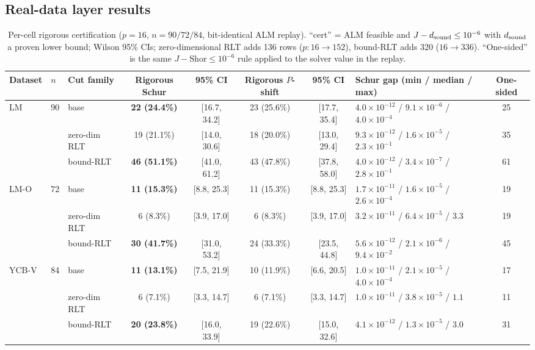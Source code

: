 \subsection{Real-data layer results}\label{app:real}
\begin{table}[t]
\centering
\caption{Per-cell rigorous certification ($p=16$, $n=90/72/84$, bit-identical ALM replay). ``cert'' = ALM feasible and $J-d_{\rm sound}\le10^{-6}$ with $d_{\rm sound}$ a proven lower bound; Wilson 95\% CIs; zero-dimensional RLT adds 136 rows ($p:16\to152$), bound-RLT adds 320 ($16\to336$). ``One-sided'' is the same $J-\mathrm{Shor}\le10^{-6}$ rule applied to the solver value in the replay.}
\label{tab:rigorous_full}
\scriptsize
\setlength{\tabcolsep}{2.5pt}
\begin{tabular}{@{}llp{1.9cm}ccccp{5.0cm}c@{}}
\toprule
Dataset & $n$ & Cut family & Rigorous Schur & 95\% CI & Rigorous $P$-shift & 95\% CI & Schur gap (min / median / max) & One-sided \\
\midrule
\multirow{3}{*}{LM} & \multirow{3}{*}{90} & base & \textbf{22 (24.4\%)} & [16.7, 34.2] & 23 (25.6\%) & [17.7, 35.4] & $4.0{\times}10^{-12}$ / $9.1{\times}10^{-6}$ / $4.0{\times}10^{-4}$ & 25 \\
 & & zero-dim RLT & 19 (21.1\%) & [14.0, 30.6] & 18 (20.0\%) & [13.0, 29.4] & $9.3{\times}10^{-12}$ / $1.6{\times}10^{-5}$ / $2.3{\times}10^{-1}$ & 35 \\
 & & bound-RLT & \textbf{46 (51.1\%)} & [41.0, 61.2] & 43 (47.8\%) & [37.8, 58.0] & $4.0{\times}10^{-12}$ / $3.4{\times}10^{-7}$ / $2.8{\times}10^{-1}$ & 61 \\
\midrule
\multirow{3}{*}{LM-O} & \multirow{3}{*}{72} & base & \textbf{11 (15.3\%)} & [8.8, 25.3] & 11 (15.3\%) & [8.8, 25.3] & $1.7{\times}10^{-11}$ / $1.6{\times}10^{-5}$ / $2.6{\times}10^{-4}$ & 19 \\
 & & zero-dim RLT & 6 (8.3\%) & [3.9, 17.0] & 6 (8.3\%) & [3.9, 17.0] & $3.2{\times}10^{-11}$ / $6.4{\times}10^{-5}$ / $3.3$ & 19 \\
 & & bound-RLT & \textbf{30 (41.7\%)} & [31.0, 53.2] & 24 (33.3\%) & [23.5, 44.8] & $5.6{\times}10^{-12}$ / $2.1{\times}10^{-6}$ / $9.4{\times}10^{-2}$ & 45 \\
\midrule
\multirow{3}{*}{YCB-V} & \multirow{3}{*}{84} & base & \textbf{11 (13.1\%)} & [7.5, 21.9] & 10 (11.9\%) & [6.6, 20.5] & $1.0{\times}10^{-11}$ / $2.1{\times}10^{-5}$ / $4.0{\times}10^{-4}$ & 17 \\
 & & zero-dim RLT & 6 (7.1\%) & [3.3, 14.7] & 6 (7.1\%) & [3.3, 14.7] & $1.0{\times}10^{-11}$ / $3.8{\times}10^{-5}$ / $1.1$ & 11 \\
 & & bound-RLT & \textbf{20 (23.8\%)} & [16.0, 33.9] & 19 (22.6\%) & [15.0, 32.6] & $4.1{\times}10^{-12}$ / $1.3{\times}10^{-5}$ / $3.0$ & 31 \\
\bottomrule
\end{tabular}
\end{table}

